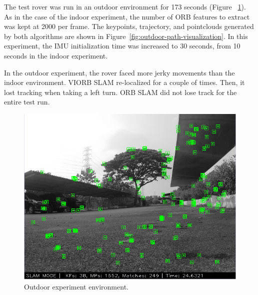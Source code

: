 The test rover was run in an outdoor environment for 173 seconds (Figure ~\ref{fig:outdoor-experiment-live}). As in the case of the indoor experiment, the number of ORB 
features to extract was kept at 2000 per frame. The keypoints, trajectory, and pointclouds generated by both algorithms are shown in Figure~\ref{fig:outdoor-path-visualization}. In this experiment, the IMU initialization time was increased to 30 seconds, from 10 seconds in the indoor experiment.

In the outdoor experiment, the rover faced more jerky movements than the 	indoor environment. VIORB SLAM re-localized for a couple of times. Then, it lost tracking when taking a left turn. ORB SLAM did not lose track for the entire test run.

\begin{figure}[h]
	\centering
	\includegraphics[width=5.5in]{figures/demo3_screen}
	\caption[Outdoor experiment environment]{\small 
		Outdoor experiment environment. }
	\label{fig:outdoor-experiment-live}
\end{figure}


